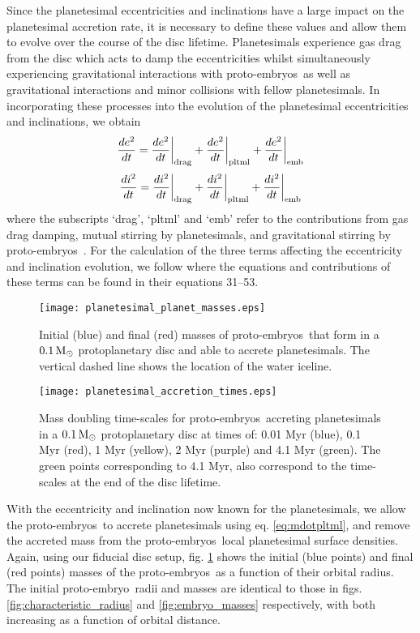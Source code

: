 \documentclass[a4paper,fleqn,usenatbib]{mnras}
\newcommand{\msun}{{\, {\rm M}_{\odot}}}
\newcommand{\emb}{{{proto-embryo~}}}
\newcommand{\embs}{{{proto-embryos~}}}
\begin{document}
Since the planetesimal eccentricities and inclinations have a large impact on the planetesimal accretion rate, it is necessary to define these values and allow them to evolve over the course of the disc lifetime.
Planetesimals experience gas drag from the disc which acts to damp the eccentricities whilst simultaneously experiencing gravitational interactions with \embs as well as gravitational interactions and minor collisions with fellow planetesimals.
In incorporating these processes into the evolution of the planetesimal eccentricities and inclinations, we obtain
\begin{equation}
    \dfrac{de^2}{dt}=\dfrac{de^2}{dt}\bigg|_{\rm drag}+ \dfrac{de^2}{dt}\bigg|_{\rm pltml} + \dfrac{de^2}{dt}\bigg|_{\rm emb}
\end{equation}
\begin{equation}
    \dfrac{di^2}{dt}=\dfrac{di^2}{dt}\bigg|_{\rm drag}+ \dfrac{di^2}{dt}\bigg|_{\rm pltml} + \dfrac{di^2}{dt}\bigg|_{\rm emb}
\end{equation}
where the subscripts `drag', `pltml' and `emb' refer to the contributions from gas drag damping, mutual stirring by planetesimals, and gravitational stirring by \embs.
For the calculation of the three terms affecting the eccentricity and inclination evolution, we follow \citet{Fortier13} where the equations and contributions of these terms can be found in their equations 31--53.

\begin{figure}
\centering
\texttt{[image: planetesimal\_planet\_masses.eps]}
\caption{Initial (blue) and final (red) masses of \embs that form in a $0.1 \msun$ protoplanetary disc and able to accrete planetesimals. The vertical dashed line shows the location of the water iceline.}
\label{fig:planetesimal_masses}
\end{figure}

\begin{figure}
\centering
\texttt{[image: planetesimal\_accretion\_times.eps]}
\caption{Mass doubling time-scales for \embs accreting planetesimals in a $0.1 \msun$ protoplanetary disc at times of: 0.01 Myr (blue), 0.1 Myr (red), 1 Myr (yellow), 2 Myr (purple) and 4.1 Myr (green). The green points corresponding to 4.1 Myr, also correspond to the time-scales at the end of the disc lifetime.}
\label{fig:planetesimal_accretion_time}
\end{figure}

With the eccentricity and inclination now known for the planetesimals, we allow the \embs to accrete planetesimals using eq. \ref{eq:mdotpltml}, and remove the accreted mass from the \embs local planetesimal surface densities.
Again, using our fiducial disc setup, fig. \ref{fig:planetesimal_masses} shows the initial (blue points) and final (red points) masses of the \embs as a function of their orbital radius.
The initial \emb radii and masses are identical to those in figs. \ref{fig:characteristic_radius} and \ref{fig:embryo_masses} respectively, with both increasing as a function of orbital distance.
\end{document}
